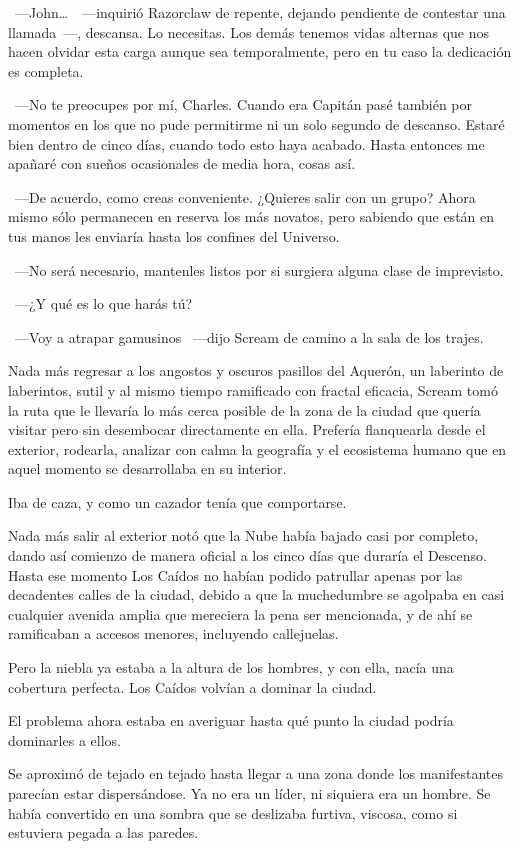 ~---John\dots\ ~---inquirió Razorclaw de repente, dejando pendiente de contestar una llamada~---, descansa. Lo necesitas. Los demás tenemos vidas alternas que nos hacen olvidar esta carga aunque sea temporalmente, pero en tu caso la dedicación es completa.

~---No te preocupes por mí, Charles. Cuando era Capitán pasé también por momentos en los que no pude permitirme ni un solo segundo de descanso. Estaré bien dentro de cinco días, cuando todo esto haya acabado. Hasta entonces me apañaré con sueños ocasionales de media hora, cosas así.

~---De acuerdo, como creas conveniente. ¿Quieres salir con un grupo? Ahora mismo sólo permanecen en reserva los más novatos, pero sabiendo que están en tus manos les enviaría hasta los confines del Universo.

~---No será necesario, mantenles listos por si surgiera alguna clase de imprevisto.

~---¿Y qué es lo que harás tú?

~---Voy a atrapar gamusinos ~---dijo Scream de camino a la sala de los trajes.

\bigskip\noindent
Nada más regresar a los angostos y oscuros pasillos del Aquerón, un laberinto de laberintos, sutil y al mismo tiempo ramificado con fractal eficacia, Scream tomó la ruta que le llevaría lo más cerca posible de la zona de la ciudad que quería visitar pero sin desembocar directamente en ella. Prefería flanquearla desde el exterior, rodearla, analizar con calma la geografía y el ecosistema humano que en aquel momento se desarrollaba en su interior.

Iba de caza, y como un cazador tenía que comportarse.

Nada más salir al exterior notó que la Nube había bajado casi por completo, dando así comienzo de manera oficial a los cinco días que duraría el Descenso. Hasta ese momento Los Caídos no habían podido patrullar apenas por las decadentes calles de la ciudad, debido a que la muchedumbre se agolpaba en casi cualquier avenida amplia que mereciera la pena ser mencionada, y de ahí se ramificaban a accesos menores, incluyendo callejuelas.

Pero la niebla ya estaba a la altura de los hombres, y con ella, nacía una cobertura perfecta. Los Caídos volvían a dominar la ciudad.

El problema ahora estaba en averiguar hasta qué punto la ciudad podría dominarles a ellos.

Se aproximó de tejado en tejado hasta llegar a una zona donde los manifestantes parecían estar dispersándose. Ya no era un líder, ni siquiera era un hombre. Se había convertido en una sombra que se deslizaba furtiva, viscosa, como si estuviera pegada a las paredes.

